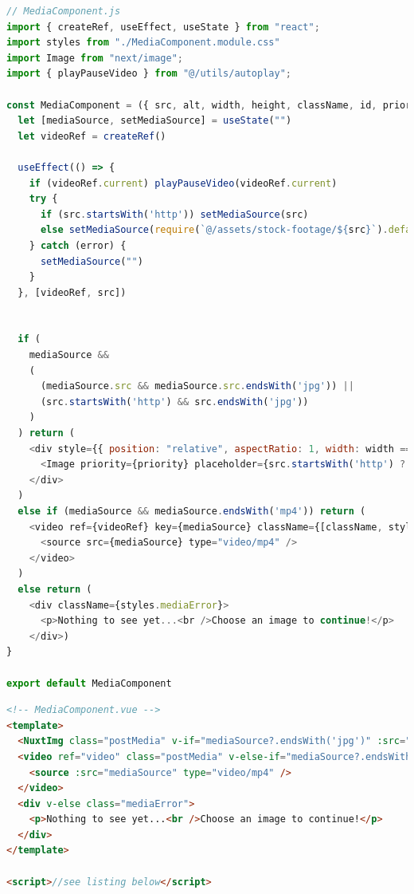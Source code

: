 \documentclass[a4paper, 10pt]{article}
\begin{document}
\begin{lstlisting}[caption=MediaComponent in Next.js, label={lst:Next:MediaComponent}, language=JavaScript]
// MediaComponent.js
import { createRef, useEffect, useState } from "react";
import styles from "./MediaComponent.module.css"
import Image from "next/image";
import { playPauseVideo } from "@/utils/autoplay";

const MediaComponent = ({ src, alt, width, height, className, id, priority = false }) => {
  let [mediaSource, setMediaSource] = useState("")
  let videoRef = createRef()

  useEffect(() => {
    if (videoRef.current) playPauseVideo(videoRef.current)
    try {
      if (src.startsWith('http')) setMediaSource(src)
      else setMediaSource(require(`@/assets/stock-footage/${src}`).default)
    } catch (error) {
      setMediaSource("")
    }
  }, [videoRef, src])


  if (
    mediaSource &&
    (
      (mediaSource.src && mediaSource.src.endsWith('jpg')) ||
      (src.startsWith('http') && src.endsWith('jpg'))
    )
  ) return (
    <div style={{ position: "relative", aspectRatio: 1, width: width == "100%" ? width : `${width}px`, overflow: "hidden" }} id={id} className={[className, styles.postMedia].join(" ")}>
      <Image priority={priority} placeholder={src.startsWith('http') ? "empty" : "blur"} quality={50} src={mediaSource} alt={alt} width={width.endsWith("%") ? 600 : width} height={height || (width.endsWith("%") ? 600 : width)} />
    </div>
  )
  else if (mediaSource && mediaSource.endsWith('mp4')) return (
    <video ref={videoRef} key={mediaSource} className={[className, styles.postMedia].join(" ")} id={id} width={width} preload="metadata" controls controlsList="nodownload,nofullscreen,noremoteplayback" disablePictureInPicture loop muted >
      <source src={mediaSource} type="video/mp4" />
    </video>
  )
  else return (
    <div className={styles.mediaError}>
      <p>Nothing to see yet...<br />Choose an image to continue!</p>
    </div>)
}

export default MediaComponent
\end{lstlisting}

\begin{lstlisting}[caption=MediaComponent in Nuxt (Template), label={lst:Nuxt:MediaComponent:Template}, language=HTML]
<!-- MediaComponent.vue -->
<template>
  <NuxtImg class="postMedia" v-if="mediaSource?.endsWith('jpg')" :src="mediaSource" :alt="alt" :preset="preset" :loading="priority ? 'eager' : 'lazy'" :preload="priority" :width="$config.public.image_presets[preset].modifiers.width" :height="$config.public.image_presets[preset].modifiers.height"/>
  <video ref="video" class="postMedia" v-else-if="mediaSource?.endsWith('mp4')" :width="width" preload="metadata" controls controlslist="nodownload,nofullscreen,noremoteplayback" disablepictureinpicture loop muted >
    <source :src="mediaSource" type="video/mp4" />
  </video>
  <div v-else class="mediaError">
    <p>Nothing to see yet...<br />Choose an image to continue!</p>
  </div>
</template>

<script>//see listing below</script>
\end{lstlisting}
\end{document}
